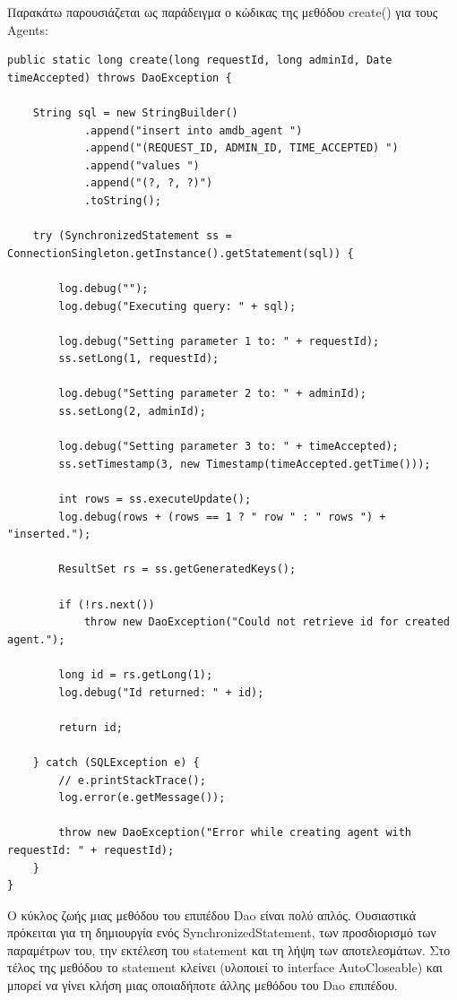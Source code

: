 \documentclass[a4paper,11pt]{article}
\begin{document}
\begin{sloppypar}
\newpage

Παρακάτω παρουσιάζεται ως παράδειγμα ο κώδικας της μεθόδου create() για τους Agents:
\begin{lstlisting}
public static long create(long requestId, long adminId, Date timeAccepted) throws DaoException {

    String sql = new StringBuilder()
            .append("insert into amdb_agent ")
            .append("(REQUEST_ID, ADMIN_ID, TIME_ACCEPTED) ")
            .append("values ")
            .append("(?, ?, ?)")
            .toString();

    try (SynchronizedStatement ss = ConnectionSingleton.getInstance().getStatement(sql)) {

        log.debug("");
        log.debug("Executing query: " + sql);

        log.debug("Setting parameter 1 to: " + requestId);
        ss.setLong(1, requestId);

        log.debug("Setting parameter 2 to: " + adminId);
        ss.setLong(2, adminId);

        log.debug("Setting parameter 3 to: " + timeAccepted);
        ss.setTimestamp(3, new Timestamp(timeAccepted.getTime()));

        int rows = ss.executeUpdate();
        log.debug(rows + (rows == 1 ? " row " : " rows ") + "inserted.");

        ResultSet rs = ss.getGeneratedKeys();

        if (!rs.next())
            throw new DaoException("Could not retrieve id for created agent.");

        long id = rs.getLong(1);
        log.debug("Id returned: " + id);

        return id;

    } catch (SQLException e) {
        // e.printStackTrace();
        log.error(e.getMessage());

        throw new DaoException("Error while creating agent with requestId: " + requestId);
    }
}
\end{lstlisting}

Ο κύκλος ζωής μιας μεθόδου του επιπέδου Dao είναι πολύ απλός. Ουσιαστικά πρόκειται για τη δημιουργία ενός SynchronizedStatement, των προσδιορισμό των παραμέτρων του, την εκτέλεση του statement και τη λήψη των αποτελεσμάτων. Στο τέλος της μεθόδου το statement κλείνει (υλοποιεί το interface AutoCloseable) και μπορεί να γίνει κλήση μιας οποιαδήποτε άλλης μεθόδου του Dao επιπέδου.


\end{sloppypar}
\end{document}
